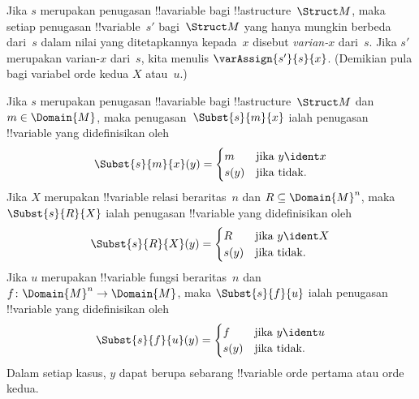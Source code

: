 \documentclass[../../../include/open-logic-section]{subfiles}
\begin{document}
\begin{defn}[Varian-$x$]
Jika $s$ merupakan penugasan !!a{variable} bagi !!a{structure}~$\Struct M$,
maka setiap penugasan !!{variable}~$s'$ bagi~$\Struct M$ yang hanya mungkin
berbeda dari~$s$ dalam nilai yang ditetapkannya kepada~$x$ disebut
\emph{varian-$x$} dari~$s$. Jika $s'$ merupakan varian-$x$ dari~$s$, kita
menulis $\varAssign{s'}{s}{x}$. (Demikian pula bagi variabel orde kedua $X$
atau~$u$.)
\end{defn}

\begin{defn}
  Jika $s$ merupakan penugasan !!a{variable} bagi !!a{structure}~$\Struct M$
  dan $m \in \Domain{M}$, maka penugasan~$\Subst{s}{m}{x}$ ialah penugasan
  !!{variable} yang didefinisikan oleh
  \[\Subst{s}{m}{x}(y) = \begin{cases}
    m & \text{jika } y \ident x\\
    s(y) & \text{jika tidak}.
  \end{cases}\]
  Jika $X$ merupakan !!{variable} relasi beraritas~$n$ dan $R \subseteq
  \Domain{M}^n$, maka $\Subst{s}{R}{X}$ ialah penugasan !!{variable} yang
  didefinisikan oleh
  \[\Subst{s}{R}{X}(y) = \begin{cases}
    R & \text{jika } y \ident X\\
    s(y) & \text{jika tidak}.
  \end{cases}\]
  Jika $u$ merupakan !!{variable} fungsi beraritas~$n$ dan
  $f\colon \Domain{M}^n \to \Domain{M}$, maka $\Subst{s}{f}{u}$ ialah
  penugasan !!{variable} yang didefinisikan oleh
  \[\Subst{s}{f}{u}(y) = \begin{cases}
    f & \text{jika } y \ident u\\
    s(y) & \text{jika tidak}.
  \end{cases}\]
  Dalam setiap kasus, $y$ dapat berupa sebarang !!{variable} orde pertama
  atau orde kedua.
\end{defn}
\end{document}
